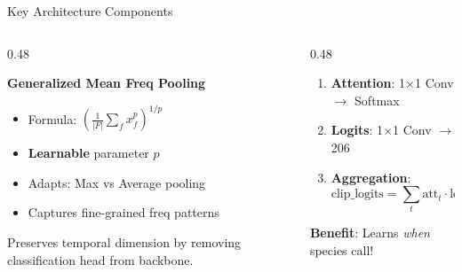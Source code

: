 \documentclass[aspectratio=169, 11pt]{beamer}
\begin{document}
\begin{frame}[t]{Key Architecture Components}
    \begin{columns}[T, onlytextwidth]
        \begin{column}{0.48\textwidth}
            \begin{tcolorbox}[draculabox={GeMFreq Pooling}]
                \scriptsize
                \textbf{Generalized Mean Freq Pooling}
                \begin{itemize}
                    \item Formula: $\left(\frac{1}{|F|}\sum_{f} x_f^p\right)^{1/p}$
                    \item \textbf{Learnable} parameter $p$
                    \item Adapts: Max vs Average pooling
                    \item Captures fine-grained freq patterns
                \end{itemize}
            \end{tcolorbox}

            \begin{tcolorbox}[greenbox_tcb={Features Only}]
                \scriptsize Preserves temporal dimension by removing classification head from backbone.
            \end{tcolorbox}
        \end{column}
        \begin{column}{0.48\textwidth}
            \begin{tcolorbox}[draculabox={AttHead (Attention)}]
                \scriptsize
                \begin{enumerate}
                    \item \textbf{Attention}: 1$\times$1 Conv $\rightarrow$ Softmax
                    \item \textbf{Logits}: 1$\times$1 Conv $\rightarrow$ 206
                    \item \textbf{Aggregation}:
                    $$\text{clip\_logits} = \sum_t \text{att}_t \cdot \text{logits}_t$$
                \end{enumerate}
                \textcolor{draculagreen}{\textbf{Benefit}}: Learns \textit{when} species call!
            \end{tcolorbox}
        \end{column}
    \end{columns}
\end{frame}
\end{document}
